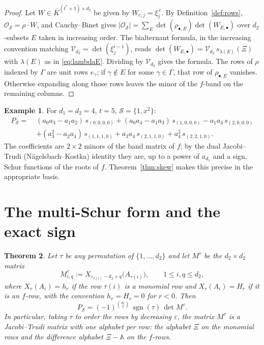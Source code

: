 \documentclass[11pt,reqno]{amsart}
\theoremstyle{plain}
\newtheorem{theorem}{Theorem}[section]
\theoremstyle{definition}
\newtheorem{example}[theorem]{Example}
\DeclareMathOperator{\sgn}{sgn}
\newcommand{\bA}{\mathbb{A}}
\newcommand{\bX}{\Xi}
\newcommand{\cO}{\mathcal{O}}
\newcommand{\cS}{\mathcal{S}}
\newcommand{\cV}{\mathcal{V}}
\begin{document}
\begin{proof}
Let $W\in\overline K^{(t^*+1)\times d_2}$ be given by $W_{c,j}=\xi_j^{\,c}$. By
Definition~\ref{def:rows}, $\cO_\cS=\rho\cdot W$, and Cauchy--Binet gives
$|\cO_\cS|=\sum_E\det(\rho_{\bullet,E})\det(W_{E,\bullet})$ over $d_2$-subsets
$E$ taken in increasing order. The bialternant formula, in the increasing
convention matching $\cV_{d_2}=\det(\xi_j^{i-1})$, reads
$\det(W_{E,\bullet})=\cV_{d_2}\,s_{\lambda(E)}(\bX)$ with $\lambda(E)$ as in
\eqref{eq:lambdaE}. Dividing by $\cV_{d_2}$ gives the formula. The rows of $\rho$
indexed by $\Gamma$ are unit rows $e_\gamma$; if $\gamma\notin E$ for some
$\gamma\in\Gamma$, that row of $\rho_{\bullet,E}$ vanishes. Otherwise expanding
along those rows leaves the minor of the $f$-band on the remaining columns.
\end{proof}

\begin{example}\label{ex:cb}
For $d_1=d_2=4$, $t=5$, $\cS=\{1,x^2\}$:
\[
\begin{aligned}
P_\cS=\;&(a_0a_3-a_1a_2)\,s_{(0,0,0,0)}+(a_0a_4-a_1a_3)\,s_{(1,0,0,0)}
        -a_1a_4\,s_{(2,0,0,0)}\\
       &+(a_3^2-a_2a_4)\,s_{(1,1,1,0)}+a_3a_4\,s_{(2,1,1,0)}
        +a_4^2\,s_{(2,2,1,0)} .
\end{aligned}
\]
The coefficients are $2\times2$ minors of the band matrix of $f$; by the dual
Jacobi--Trudi (N\"agelsbach--Kostka) identity they are, up to a power of
$a_{d_1}$ and a sign, Schur functions of the roots of $f$. Theorem~\ref{thm:skew}
makes this precise in the appropriate basis.
\end{example}

\section{The multi-Schur form and the exact sign}\label{sec:multischur}

\begin{theorem}\label{thm:multischur}
Let $\tau$ be any permutation of $\{1,\dots,d_2\}$ and let $M^\tau$ be the
$d_2\times d_2$ matrix
\[
  M^\tau_{i,q}:=X_{\varepsilon_{\tau(i)}-d_2+q}\big(A_{\tau(i)}\big),
  \qquad 1\le i,q\le d_2,
\]
where $X_r(A_i)=h_r$ if the row $\tau(i)$ is a monomial row and $X_r(A_i)=H_r$ if
it is an $f$-row, with the convention $h_r=H_r=0$ for $r<0$. Then
\[
  P_\cS=(-1)^{\binom{d_2}{2}}\,\sgn(\tau)\,\det M^\tau .
\]
In particular, taking $\tau$ to order the rows by decreasing $\varepsilon$, the
matrix $M^\tau$ is a Jacobi--Trudi matrix with one alphabet per row: the alphabet
$\bX$ on the monomial rows and the difference alphabet $\bX-\bA$ on the $f$-rows.
\end{theorem}
\end{document}
